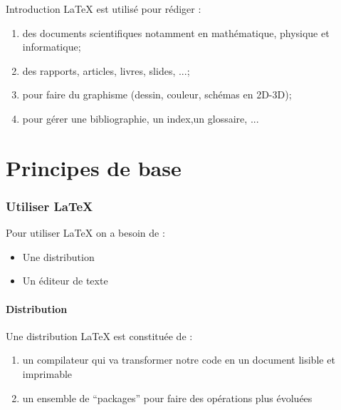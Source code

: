 \documentclass[12pt]{beamer}
\begin{document}
\begin{frame}[plain]{Introduction}
	\LaTeX{} est utilisé pour rédiger : 
	\begin{enumerate}
		\item<2-> des documents scientifiques notamment en mathématique, physique et informatique;
		\item<3-> des rapports, articles, livres, slides, ...;
		\item<4-> pour faire du graphisme (dessin, couleur, schémas en 2D-3D);
		\item<5-> pour gérer une bibliographie, un index,un glossaire, ...
	\end{enumerate}
\end{frame}

\part{Principes de base}


\section{Utiliser \LaTeX{}}
\begin{frame}[plain]
	Pour utiliser \LaTeX{} on a besoin de : 
	\begin{block}{}
		\begin{itemize}	
			\item<2-> Une distribution
			\item<3-> Un éditeur de texte	
		\end{itemize}
	\end{block}
\end{frame}
\subsection{Distribution}
  \begin{frame}
    Une distribution \LaTeX{} est constituée de :
    \begin{enumerate}
     \item<2-> un compilateur qui va transformer notre code en un document lisible et imprimable 
     \item<3-> un ensemble de ``packages'' pour faire des opérations plus évoluées
    \end{enumerate}
  \end{frame}
  
\end{document}
